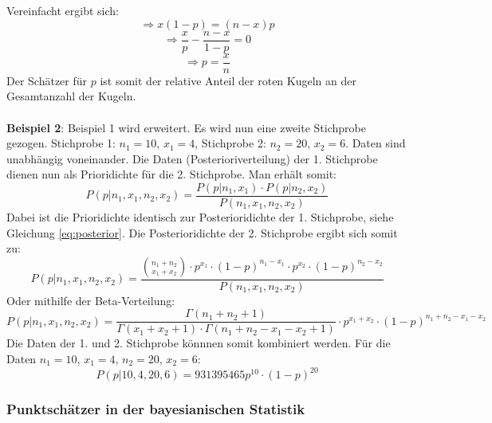\documentclass[a4paper,12pt]{article}
\begin{document}
Vereinfacht ergibt sich:
\begin{equation}
\Rightarrow x(1-p) = (n-x)p
\end{equation}
\begin{equation}  
\Rightarrow \frac{x}{p} - \frac{n-x}{1-p} = 0
\end{equation}
\begin{equation}
\Rightarrow p = \frac{x}{n}
\end{equation}
Der Schätzer für $p$ ist somit der relative Anteil der roten Kugeln an der Gesamtanzahl der Kugeln. \\\\
\textbf{Beispiel 2}: Beispiel 1 wird erweitert. Es wird nun eine zweite Stichprobe gezogen. 
Stichprobe 1: $n_1 = 10$, $x_1 = 4$, Stichprobe 2: $n_2 = 20$, $x_2 = 6$.
Daten sind unabhängig voneinander. Die Daten (Posterioriverteilung) der 1. Stichprobe dienen nun
als Prioridichte für die 2. Stichprobe. Man erhält somit:
\begin{equation}
P(p|n_1,x_1,n_2,x_2) = \frac{P(p|n_1,x_1) \cdot P(p|n_2,x_2)}{P(n_1,x_1,n_2,x_2)}
\end{equation}
Dabei ist die Prioridichte identisch zur Posterioridichte der 1. Stichprobe, siehe Gleichung \eqref{eq:posterior}.
Die Posterioridichte der 2. Stichprobe ergibt sich somit zu:
\begin{equation}
P(p|n_1,x_1,n_2,x_2) = \frac{\binom{n_1+n_2}{x_1+x_2} \cdot p^{x_1} \cdot (1-p)^{n_1-x_1} \cdot p^{x_2} \cdot (1-p)^{n_2-x_2}}{P(n_1,x_1,n_2,x_2)}
\end{equation}
Oder mithilfe der Beta-Verteilung:
\begin{equation}
  P(p|n_1,x_1,n_2,x_2) = \frac{\Gamma(n_1+n_2+1)}{\Gamma(x_1+x_2+1)\cdot\Gamma(n_1+n_2-x_1-x_2+1)} \cdot p^{x_1+x_2} \cdot (1-p)^{n_1+n_2-x_1-x_2}
\end{equation}
Die Daten der 1. und 2. Stichprobe könnnen somit kombiniert werden.
Für die Daten $n_1 = 10$, $x_1 = 4$, $n_2 = 20$, $x_2 = 6$:
\begin{equation}
P(p|10,4,20,6) = 931 395 465p^{10} \cdot (1-p)^{20}
\end{equation}

\subsubsection{Punktschätzer in der bayesianischen Statistik}





\newpage
\end{document}
